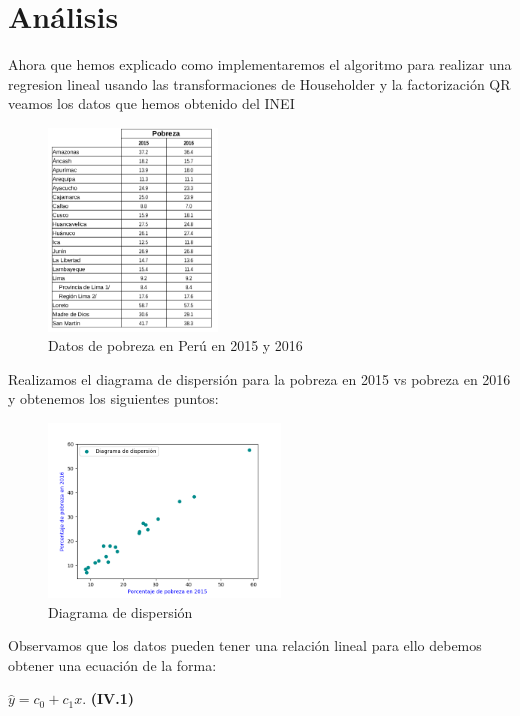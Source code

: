 \documentclass[twocolumn,twoside]{article}
\begin{document}
\section{An\'alisis}
Ahora que hemos explicado como implementaremos el algoritmo para realizar una regresion lineal
usando las transformaciones de Householder y la factorizaci\'on QR veamos los datos que hemos 
obtenido del INEI \\

\begin{figure}[H]
  \centering
    \includegraphics[width=0.4\textwidth]{tabla_1}
  \caption{Datos de pobreza en Per\'u en 2015 y 2016}
  \label{tabla:datos}
\end{figure}

Realizamos el diagrama de dispersi\'on para la pobreza en 2015 vs pobreza
en 2016 y obtenemos los siguientes puntos:\\
\begin{figure}[H]
  \centering
    \includegraphics[width=0.55\textwidth]{Figure_1}
  \caption{Diagrama de dispersi\'on}
  \label{figura:dispersion}
\end{figure}

Observamos que los datos pueden tener una relaci\'on lineal para ello debemos 
obtener una ecuaci\'on de la forma:
\begin{center}
  $\hat y=c_0+c_1x$. \textbf{(IV.1)}
\end{center}
\end{document}
